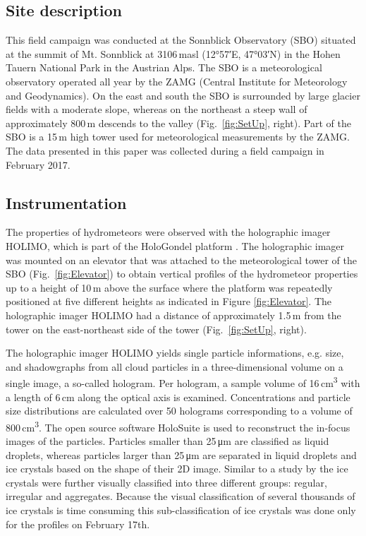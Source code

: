 \documentclass[draft,linenumbers]{agujournal}
\begin{document}
\subsection{Site description}

This field campaign was conducted at the Sonnblick Observatory (SBO) situated at the summit of Mt. Sonnblick at 3106\,\si{masl} (\ang{12;57;}E, \ang{47;03;}N) in the Hohen Tauern National Park in the Austrian Alps. The SBO is a meteorological observatory operated all year by the ZAMG (Central Institute for Meteorology and Geodynamics). On the east and south the SBO is surrounded by large glacier fields with a moderate slope, whereas on the northeast a steep wall of approximately 800\,\si{m} descends to the valley (Fig.~\ref{fig:SetUp}, right). Part of the SBO is a 15\,\si{m} high tower used for meteorological measurements by the ZAMG. The data presented in this paper was collected during a field campaign in February 2017. 

\subsection{Instrumentation}
The properties of hydrometeors were observed with the holographic imager HOLIMO, which is part of the HoloGondel platform \citep{Bec17}. The holographic imager was mounted on an elevator that was attached to the meteorological tower of the SBO (Fig.~\ref{fig:Elevator}) to obtain vertical profiles of the hydrometeor properties up to a height of 10\,\si{m} above the surface where the platform was repeatedly positioned at five different heights as indicated in Figure \ref{fig:Elevator}. The holographic imager HOLIMO had a distance of approximately 1.5\,\si{m} from the tower on the east-northeast side of the tower (Fig.~\ref{fig:SetUp}, right). 

The holographic imager HOLIMO yields single particle informations, e.g. size, and shadowgraphs from all cloud particles in a three-dimensional volume on a single image, a so-called hologram. Per hologram, a sample volume of 16\,\si{cm^3} with a length of 6\,\si{cm} along the optical axis is examined. Concentrations and particle size distributions are calculated over 50 holograms corresponding to a volume of 800\,\si{cm^3}. The open source software HoloSuite \citep{Fug15} is used to reconstruct the in-focus images of the particles. Particles smaller than 25\,\si{\um} are classified as liquid droplets, whereas particles larger than 25\,\si{\um} are separated in liquid droplets and ice crystals based on the shape of their 2D image. Similar to a study by \cite{Sch17} the ice crystals were further visually classified into three different groups: regular, irregular and aggregates. Because the visual classification of several thousands of ice crystals is time consuming this sub-classification of ice crystals was done only for the profiles on February 17th.
\end{document}
